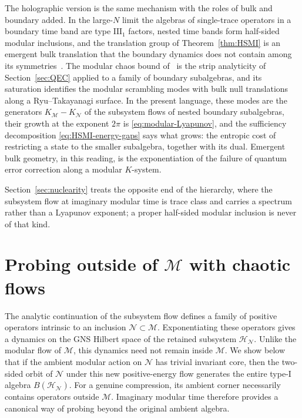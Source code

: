 \documentclass[a4paper,11pt]{article}
\theoremstyle{definition}
\newcommand{\mN}{\mathcal{N}}
\newcommand{\lb}{\left(}
\newcommand{\rb}{\right)}
\newcommand{\mH}{\mathcal{H}}
\newcommand{\mM}{\mathcal{M}}
\begin{document}
The holographic version is the same mechanism with the roles of bulk and boundary added. In the large-$N$ limit the algebras of single-trace operators in a boundary time band are type $\mathrm{III}_1$ factors, nested time bands form half-sided modular inclusions, and the translation group of Theorem~\ref{thm:HSMI} is an emergent bulk translation that the boundary dynamics does not contain among its symmetries~\cite{LeutheusserLiu2023}. The modular chaos bound of~\cite{deBoerLamprou2020} is the strip analyticity of Section~\ref{sec:QEC} applied to a family of boundary subalgebras, and its saturation identifies the modular scrambling modes with bulk null translations along a Ryu--Takayanagi surface. In the present language, these modes are the generators $K_{\mM}-K_{\mN}$ of the subsystem flows of nested boundary subalgebras, their growth at the exponent $2\pi$ is \eqref{eq:modular-Lyapunov}, and the sufficiency decomposition \eqref{eq:HSMI-energy-gaps} says what grows: the entropic cost of restricting a state to the smaller subalgebra, together with its dual. Emergent bulk geometry, in this reading, is the exponentiation of the failure of quantum error correction along a modular $K$-system.

Section~\ref{sec:nuclearity} treats the opposite end of the hierarchy, where the subsystem flow at imaginary modular time is trace class and carries a spectrum rather than a Lyapunov exponent; a proper half-sided modular inclusion is never of that kind.





\section{Probing outside of \texorpdfstring{$\mM$}{M} with chaotic flows}
\label{sec:probing-outside-M}

The analytic continuation of the subsystem flow defines a family of positive
operators intrinsic to an inclusion $\mN\subset \mM$. Exponentiating these operators gives a dynamics on the GNS
Hilbert space of the retained subsystem $\mH_{\mN}$. Unlike the modular flow of
$\mM$, this dynamics need not remain inside $\mM$. We show
below that if the ambient modular action on $\mN$ has trivial invariant core, then
the two-sided orbit of $\mN$ under this new positive-energy flow
generates the entire type-I algebra $B(\mH_{\mN})$. For a genuine compression,
its ambient corner necessarily contains operators outside $\mM$. Imaginary modular time therefore
provides a canonical way of probing beyond the original ambient algebra.
\end{document}
